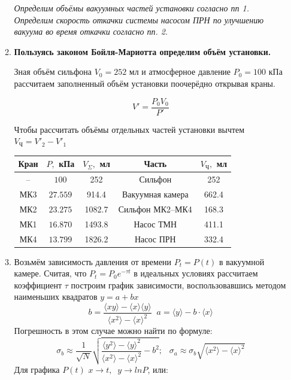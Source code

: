 \documentclass[a4paper,12pt]{article}
\begin{document}
\begin{enumerate}
\begin{enumerate}
	\emph{Определим объёмы вакуумных частей установки согласно пп 1. Определим скорость откачки системы насосом ПРН по улучшению вакуума во время откачки согласно пп. 2.}
	
\item \textbf{Пользуясь законом Бойля-Мариотта определим объём установки.}

Зная объём сильфона $V_0 = 252$ мл и атмосферное давление $P_0 = 100$ кПа рассчитаем заполненный объём установки поочерёдно открывая краны.

\[
V' = \frac{P_0 V_0}{P'}
\]

Чтобы рассчитать объёмы отдельных частей установки вычтем $V_\text{Ч} = V'_2 - V'_1$

\begin{center}
\begin{tabular}{|c|c|c|c|c|}
\hline 
Кран & $P, $ кПа & $V_\Sigma, $ мл & Часть & $V_\text{Ч}, $ мл \\ 
\hline 
-- & $100$ & 252 & Сильфон & 252 \\ 
\hline 
МК3 & $27.559$ & 914.4 & Вакуумная камера & 662.4 \\ 
\hline 
МК2 & $23.275$ & 1082.7 & Сильфон МК2--МК4 & 168.3 \\ 
\hline 
МК1 & $16.870$ & 1493.8 & Насос ТМН & 411.1 \\ 
\hline 
МК4 & $13.799$ & 1826.2 & Насос ПРН & 332.4 \\ 
\hline 
\end{tabular} 
\end{center}

\item Возьмём зависимость давления от времени $P_t = P(t)$ в вакуумной камере. Считая, что $P_t = P_0 e^{-\tau t}$ в идеальных условиях рассчитаем коэффициент $ \tau $ построим график зависимости, воспользовавшись методом наименьших квадратов $ y = a + bx $
\begin{equation}
b = \frac{\langle xy \rangle - \langle x \rangle \langle y \rangle}{\langle x^2 \rangle - \langle x \rangle^2} \;\;
a = \langle y \rangle - b \cdot \langle x \rangle
\label{mnk}
\end{equation}
Погрешность в этом случае можно найти по формуле: 
\begin{equation}
\sigma_b \approx \frac{1}{\sqrt{N}}\sqrt{\frac{\langle y^2 \rangle - \langle y \rangle ^ 2}{\langle x^2 \rangle - \langle x \rangle ^ 2} - b^2} ;\;\;\ \sigma_a \approx \sigma_b\sqrt{\langle x^2 \rangle - \langle x \rangle ^2} 
\end{equation}
Для графика $P(t)$ $x \rightarrow t, \;\; y \rightarrow lnP$, или: \\


\end{enumerate}
\end{enumerate}
\end{document}
